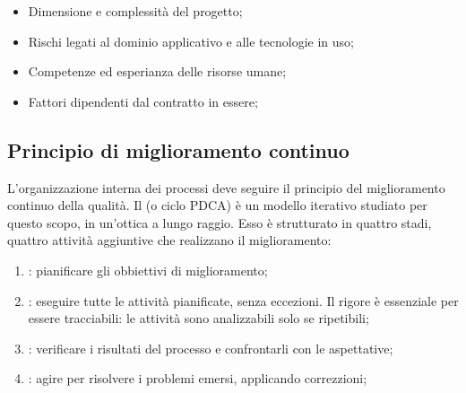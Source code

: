 \begin{itemize}
	\item Dimensione e complessità del progetto;
	\item Rischi legati al dominio applicativo e alle tecnologie in uso;
	\item Competenze ed esperianza delle risorse umane;
	\item Fattori dipendenti dal contratto in essere;
\end{itemize}

\subsection{Principio di miglioramento continuo}

L'organizzazione interna dei processi deve seguire il principio del
miglioramento continuo della qualità. Il  (o ciclo PDCA)
è un modello iterativo studiato per questo scopo, in un'ottica a lungo raggio.
Esso è strutturato in quattro stadi, quattro attività aggiuntive che realizzano
il miglioramento:

\begin{enumerate}
  \item {}: pianificare gli obbiettivi di miglioramento;
  \item {}: eseguire tutte le attività pianificate, senza
    eccezioni. Il rigore è essenziale per essere tracciabili: le attività
    sono analizzabili solo se ripetibili;
  \item {}: verificare i risultati del processo e
    confrontarli con le aspettative;
  \item {}: agire per risolvere i problemi emersi,
    applicando correzzioni;
\end{enumerate}
